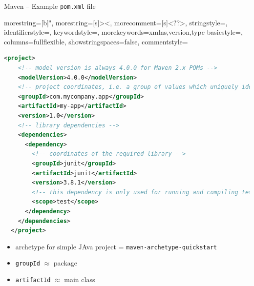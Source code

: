 \documentclass[English,c,%
hyperref={%
    pdftitle={FISA-DE2 OOP in Java},%
    pdfauthor={Muller, Gravier, Laforest, Subercaze},%
    pdfsubject={OOP in Java},%
    pdfkeywords={OOP, Java},%
    colorlinks=true,%
    urlcolor=blue,%
    linkcolor=%
    },%
xcolor={pdftex,svgnames} %
]{beamer}
\begin{document}
\begin{frame}[fragile]{Maven -- Example \texttt{pom.xml} file}

{
  morestring=[b]",
  morestring=[s]{>}{<},
  morecomment=[s]{<?}{?>},
  stringstyle=\color{black},
  identifierstyle=\color{darkblue},
  keywordstyle=\color{cyan},
  morekeywords={xmlns,version,type}%
  basicstyle=\ttfamily,
  columns=fullflexible,
  showstringspaces=false,
  commentstyle=\color{gray}\upshape
}

  \begin{lstlisting}[language=XML]
  <project>
    <!-- model version is always 4.0.0 for Maven 2.x POMs -->
    <modelVersion>4.0.0</modelVersion>
    <!-- project coordinates, i.e. a group of values which uniquely identify this project -->
    <groupId>com.mycompany.app</groupId>
    <artifactId>my-app</artifactId>
    <version>1.0</version>
    <!-- library dependencies -->
    <dependencies>
      <dependency>
        <!-- coordinates of the required library -->
        <groupId>junit</groupId>
        <artifactId>junit</artifactId>
        <version>3.8.1</version>
        <!-- this dependency is only used for running and compiling tests -->
        <scope>test</scope>
      </dependency>
    </dependencies>
  </project>
  \end{lstlisting}

  \begin{itemize}
    \bigskip
    \item archetype for simple JAva project = \texttt{maven-archetype-quickstart}
    \medskip
    \item \lstinline[language=XML]{groupId} $\approx$ package
    \item \lstinline[language=XML]{artifactId} $\approx$ main class
\end{itemize}

\end{frame}
\end{document}
